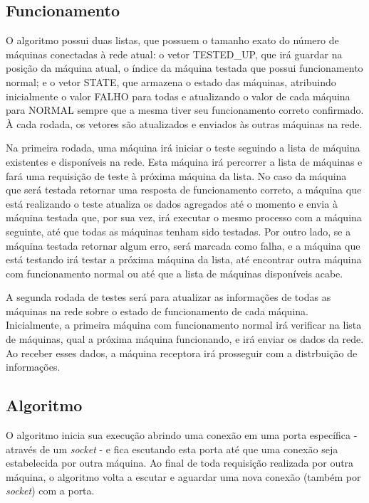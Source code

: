 \subsection{Funcionamento}
\label{sub:adaptiveDSD_Funcionamento}
O algoritmo possui duas listas, que possuem o tamanho exato do número de máquinas conectadas à rede atual: o vetor TESTED\_UP, que irá guardar na posição da máquina atual, 
o índice da máquina testada que possui funcionamento normal; e o vetor STATE, que armazena o estado das máquinas, atribuindo inicialmente o valor FALHO para todas e atualizando o valor de cada máquina para NORMAL sempre que a mesma tiver seu 
funcionamento correto confirmado. À cada rodada, os vetores são atualizados e enviados às outras máquinas na rede.

Na primeira rodada, uma máquina irá iniciar o teste seguindo a lista de máquina existentes e disponíveis na rede. Esta máquina irá percorrer a
lista de máquinas e fará uma requisição de teste à próxima máquina da lista. No caso da máquina que será testada retornar uma resposta de funcionamento correto, a máquina que está realizando o 
teste atualiza os dados agregados até o momento e envia à máquina testada que, por sua vez, irá executar o mesmo processo com a máquina seguinte, até que todas as máquinas tenham sido testadas. Por outro lado, se 
a máquina testada retornar algum erro, será marcada como falha, e a máquina que está testando irá testar a próxima máquina da lista, até encontrar outra máquina com funcionamento normal 
ou até que a lista de máquinas disponíveis acabe.

A segunda rodada de testes será para atualizar as informações de todas as máquinas na rede sobre o estado de funcionamento de cada máquina. Inicialmente, a primeira máquina com funcionamento normal 
irá verificar na lista de máquinas, qual a próxima máquina funcionando, e irá enviar os dados da rede. Ao receber esses dados, a máquina receptora irá prosseguir com a distrbuição 
de informações.

\subsection{Algoritmo}
\label{sub:adaptiveDSD_Algoritmo}
O algoritmo \adaptive{} inicia sua execução abrindo uma conexão em uma porta específica - através de um \textit{socket} - e fica escutando esta porta até que uma conexão seja estabelecida por outra máquina.
Ao final de toda requisição realizada por outra máquina, o algoritmo volta a escutar e aguardar uma nova conexão (também por \textit{socket}) com a porta.

